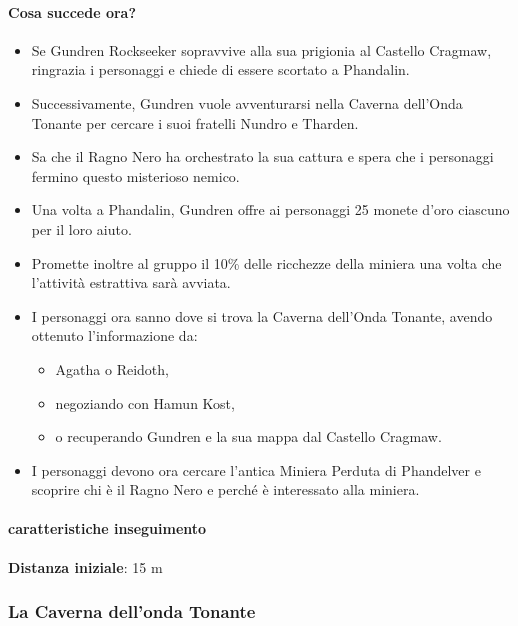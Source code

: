 \documentclass{article}
\begin{document}
\paragraph{Cosa succede ora?}
\begin{itemize}
    \item Se Gundren Rockseeker sopravvive alla sua prigionia al Castello Cragmaw, ringrazia i personaggi e chiede di essere scortato a Phandalin.
    \item Successivamente, Gundren vuole avventurarsi nella Caverna dell’Onda Tonante per cercare i suoi fratelli Nundro e Tharden.
    \item Sa che il Ragno Nero ha orchestrato la sua cattura e spera che i personaggi fermino questo misterioso nemico.
    \item Una volta a Phandalin, Gundren offre ai personaggi 25 monete d'oro ciascuno per il loro aiuto.
    \item Promette inoltre al gruppo il 10\% delle ricchezze della miniera una volta che l'attività estrattiva sarà avviata.
    \item I personaggi ora sanno dove si trova la Caverna dell’Onda Tonante, avendo ottenuto l'informazione da:
    \begin{itemize}
        \item Agatha o Reidoth,
        \item negoziando con Hamun Kost,
        \item o recuperando Gundren e la sua mappa dal Castello Cragmaw.
    \end{itemize}
    \item I personaggi devono ora cercare l'antica Miniera Perduta di Phandelver e scoprire chi è il Ragno Nero e perché è interessato alla miniera.
\end{itemize}



\paragraph{caratteristiche inseguimento}
    \textbf{Distanza iniziale}: 15 m 
    
\subsubsection{La Caverna dell'onda Tonante}    
\end{document}
